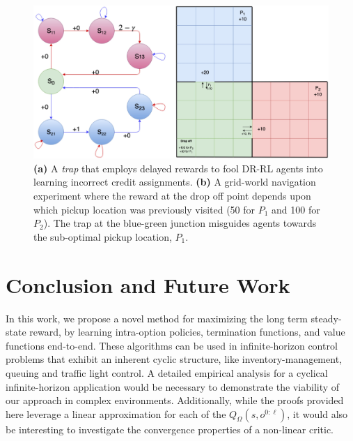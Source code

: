 \documentclass[letterpaper]{article} %
\begin{document}
\begin{figure}[t]
\centering
\includegraphics[width=\columnwidth]{BadCreditAndFRms.jpg} %
\caption{ \textbf{(a)} A \textit{trap} that employs delayed rewards to fool DR-RL agents into learning incorrect credit assignments. \textbf{(b)} A grid-world navigation experiment where the reward at the drop off point depends upon which pickup location was previously visited (50 for $P_1$ and 100 for $P_2$). The trap at the blue-green junction misguides agents towards the sub-optimal pickup location, $P_1$. }
\label{fig3}
\end{figure}

\section{Conclusion and Future Work}
In this work, we propose a novel method for maximizing the long term steady-state reward, by learning intra-option policies, termination functions, and value functions end-to-end. These algorithms can be used in infinite-horizon control problems that exhibit an inherent cyclic structure, like inventory-management, queuing and traffic light control. A detailed empirical analysis for a cyclical infinite-horizon application would be necessary to demonstrate the viability of our approach in complex environments. Additionally, while the proofs provided here leverage a linear approximation for each of the $Q_\Omega(s,o^{0:\ell})$, it would also be interesting to investigate the convergence properties of a non-linear critic.
\end{document}
